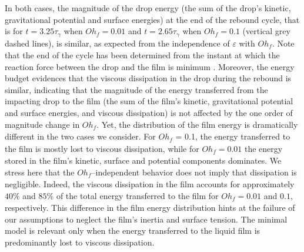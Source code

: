 \documentclass[]{jfm}
\newcommand{\Ohf}{\mathit{Oh}_\mathit{f}}
\begin{document}
In both cases, the magnitude of the drop energy (the sum of the drop's kinetic, gravitational potential and surface energies) at the end of the rebound cycle, that is for $t = 3.25\tau_\gamma$ when $\Ohf = 0.01$ and $t = 2.65\tau_\gamma$ when $\Ohf = 0.1$ (vertical grey dashed lines), is similar, as expected from the independence of $\varepsilon$ with $\Ohf$. 
Note that the end of the cycle has been determined from the instant at which the reaction force between the drop and the film is minimum \citep[see appendix~\ref{sec:restitution in simulations} and][]{zhang2022impact}. Moreover, the energy budget evidences that the viscous dissipation in the drop during the rebound is similar, indicating that the magnitude of the energy transferred from the impacting drop to the film (the sum of the film's kinetic, gravitational potential and surface energies, and viscous dissipation) is not affected by the one order of magnitude change in $\Ohf$. 
Yet, the distribution of the film energy is dramatically different in the two cases we consider. For $\Ohf$ = 0.1, the energy transferred to the film is mostly lost to viscous dissipation, while for $\Ohf = 0.01$ the energy stored in the film's kinetic, surface and potential components dominates. 
We stress here that the $\Ohf$--independent behavior does not imply that dissipation is negligible. Indeed, the viscous dissipation in the film accounts for approximately $40\%$ and $85\%$ of the total energy transferred to the film for $\Ohf = 0.01$ and $0.1$, respectively. This difference in the film energy distribution hints at the failure of our assumptions to neglect the film's inertia and surface tension. The minimal model is relevant only when the energy transferred to the liquid film is predominantly lost to viscous dissipation. 
\end{document}
